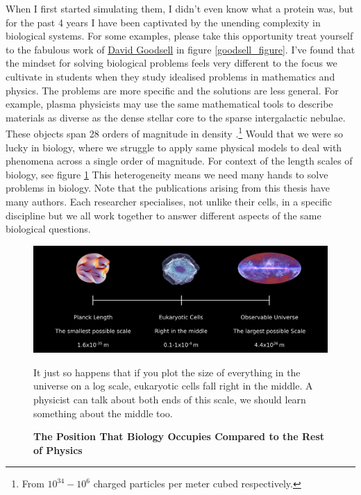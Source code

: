 When I first started simulating them, I didn't even know what a protein was, but for the past 4 years I have been captivated by the unending complexity in biological systems. For some examples, please take this opportunity treat yourself to the fabulous work of \href {https://pdb101.rcsb.org/sci-art/goodsell-gallery}{David Goodsell} in figure \ref{goodsell_figure}. I've found that the mindset for solving biological problems feels very different to the focus we cultivate in students when they study idealised problems in mathematics and physics. The problems are more specific and the solutions are less general. For example, plasma physicists may use the same mathematical tools to describe materials as diverse as the dense stellar core to the sparse intergalactic nebulae. These objects span 28 orders of magnitude in density \cite{chen2018}.\footnote{From $10^{34}-10^6$ charged particles per meter cubed respectively. } Would that we were so lucky in biology, where we struggle to apply same physical models to deal with phenomena across a single order of magnitude. For context of the length scales of biology, see figure \ref{length_scales} This heterogeneity means we need many hands to solve problems in biology. Note that the publications arising from this thesis have many authors. Each researcher specialises, not unlike their cells, in a specific discipline but we all work together to answer different aspects of the same biological questions.

\begin{figure}
	\begin{center}
		\includegraphics[width=1.0\textwidth]{figures/scales.png}
	\end{center}
	\captionsetup{singlelinecheck = false, justification=raggedright}
	\caption[The Position That Biology Occupies Compared to the Rest of Physics] {\textbf{The Position That Biology Occupies Compared to the Rest of Physics}}{It just so happens that if you plot the size of everything  in the universe on a log scale, eukaryotic cells fall right in the middle. A physicist can talk about both ends of this scale, we should learn something about the middle too.}
	\label{length_scales}
\end{figure}

